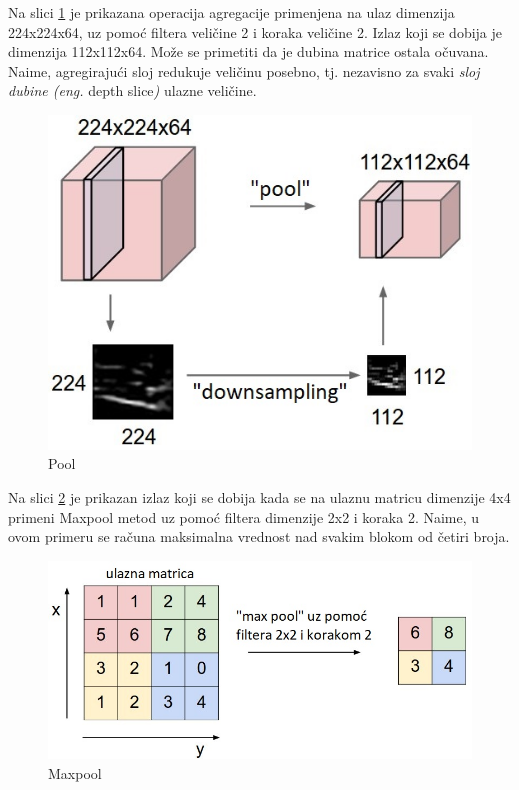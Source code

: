 \documentclass[a4paper]{article}
\begin{document}
Na slici \ref{fig:pool} je prikazana operacija agregacije primenjena na ulaz dimenzija 224x224x64, uz pomoć filtera veličine 2 i koraka veličine 2. Izlaz koji se dobija je dimenzija 112x112x64. Može se primetiti da je dubina matrice ostala očuvana. Naime, agregirajući sloj redukuje veličinu posebno, tj. nezavisno za svaki \textit{sloj dubine (eng.} depth slice\textit{)} ulazne veličine.

\begin{figure}[h!]
\begin{center}
\includegraphics[scale=0.4]{pool.jpeg}
\end{center}
\caption{Pool}
\label{fig:pool}
\end{figure}

Na slici \ref{fig:maxpool} je prikazan izlaz koji se dobija kada se na ulaznu matricu dimenzije 4x4 primeni Maxpool metod uz pomoć filtera dimenzije 2x2 i koraka 2. Naime, u ovom primeru se računa maksimalna vrednost nad svakim blokom od četiri broja.
 
\begin{figure}[h!]
\begin{center}
\includegraphics[scale=0.4]{maxpool.jpeg}
\end{center}
\caption{Maxpool}
\label{fig:maxpool}
\end{figure}
\end{document}
